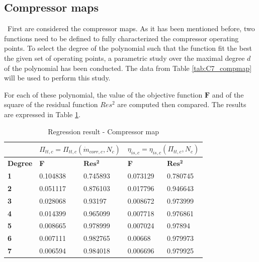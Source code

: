 \subsection{Compressor maps}
\quad\ First are considered the compressor maps. As it has been mentioned before, two functions need to be defined to fully characterized the compressor operating points.  To select the degree of the polynomial such that the function fit the best the given set of operating points, a parametric study over the maximal degree $d$ of the polynomial has been conducted. The data from Table \ref{tab:C7_compmap} will be used to perform this study.

For each of these polynomial, the value of the objective function $\textbf{F}$ and of the square of the residual function $Res^2$ are computed then compared. The results are expressed in Table \ref{tab:C7_regcomp}.

\begin{longtable}[c]{@{}lll|ll@{}}
\caption{Regression result - Compressor map}
\label{tab:C7_regcomp}\\
\toprule
                & \multicolumn{2}{l|}{$\Pi_{tt,c} = \Pi_{tt,c}(\dot{m}_{corr,c},N_c)$} & \multicolumn{2}{l}{$\eta_{is,c} = \eta_{is,c}(\Pi_{tt,c},N_c)$} \\* \midrule
\endfirsthead
%
\endhead
%
\bottomrule
\endfoot
%
\endlastfoot
%
\textbf{Degree} & \textbf{F}                     & $\mathbf{Res^2}$                    & \textbf{F}                  & $\mathbf{Res^2}$                  \\
\textbf{1}      & 0.104838                       & 0.745893                            & 0.073129                    & 0.780745                          \\
\textbf{2}      & 0.051117                       & 0.876103                            & 0.017796                    & 0.946643                          \\
\textbf{3}      & 0.028068                       & 0.93197                             & 0.008672                    & 0.973999                          \\
\textbf{4}      & 0.014399                       & 0.965099                            & 0.007718                    & 0.976861                          \\
\textbf{5}      & 0.008665                       & 0.978999                            & 0.007024                    & 0.97894                           \\
\textbf{6}      & 0.007111                       & 0.982765                            & 0.00668                     & 0.979973                          \\
\textbf{7}      & 0.006594                       & 0.984018                            & 0.006696                    & 0.979925                          \\* \bottomrule
\end{longtable}

